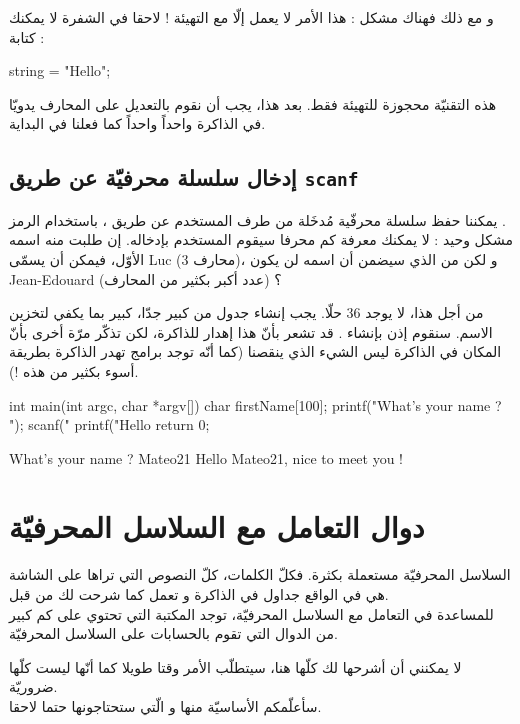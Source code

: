 و مع ذلك فهناك مشكل : هذا الأمر لا يعمل إلّا مع التهيئة ! لاحقا في الشفرة لا يمكنك كتابة :
\begin{Csource}
string = "Hello";
\end{Csource}
هذه التقنيّة محجوزة للتهيئة فقط. بعد هذا، يجب أن نقوم بالتعديل على المحارف يدويّا في الذاكرة واحداً واحداً كما فعلنا في البداية.

\subsection{إدخال سلسلة محرفيّة عن طريق
\texttt{scanf}}
يمكننا حفظ سلسلة محرفّية مُدخَلة من طرف المستخدم عن طريق
،
باستخدام الرمز
.\\
مشكل وحيد : لا يمكنك معرفة كم محرفا سيقوم المستخدم بإدخاله. إن طلبت منه اسمه الأوّل، فيمكن أن يسمّى
\textenglish{Luc}
(3 محارف)، و لكن من الذي سيضمن أن اسمه لن يكون
\textenglish{Jean-Edouard}
(عدد أكبر بكثير من المحارف) ؟

من أجل هذا، لا يوجد 36 حلّا. يجب إنشاء جدول من
كبير جدّا، كبير بما يكفي لتخزين الاسم. سنقوم إذن بإنشاء
.
قد تشعر بأنّ هذا إهدار للذاكرة، لكن تذكّر مرّة أخرى بأنّ المكان في الذاكرة ليس الشيء الذي ينقصنا
(كما أنّه توجد برامج تهدر الذاكرة بطريقة أسوء بكثير من هذه !).
\begin{Csource}
int main(int argc, char *argv[])
{
	char firstName[100];
	printf("What’s your name ? ");
	scanf("%
	printf("Hello %
	return 0;
}
\end{Csource}
\begin{Console}
What's your name ? Mateo21
Hello Mateo21, nice to meet you !
\end{Console}

\section{دوال التعامل مع السلاسل المحرفيّة}
السلاسل المحرفيّة مستعملة بكثرة. فكلّ الكلمات، كلّ النصوص التي تراها على الشاشة هي في الواقع جداول
في الذاكرة و تعمل كما شرحت لك من قبل.\\
للمساعدة في التعامل مع السلاسل المحرفيّة، توجد المكتبة
التي تحتوي على كم كبير من الدوال التي تقوم بالحسابات على السلاسل المحرفيّة.

لا يمكنني أن أشرحها لك كلّها هنا، سيتطلّب الأمر وقتا طويلا كما أنّها ليست كلّها ضروريّة.\\
سأعلّمكم الأساسيّة منها و الّتي ستحتاجونها حتما لاحقا.
